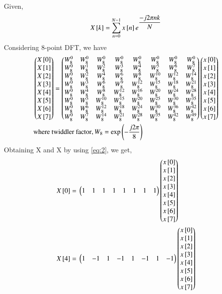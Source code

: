 \documentclass[journal,12pt,twocolumn]{IEEEtran}
\begin{document}
Given, $$X{}\left[k\right]= \sum_{n=0}^{N-1} x{}\left[n\right]e^{\dfrac{-j2\pi nk}{N}}$$
Considering 8-point DFT, we have 
\begin{align}
&\begin{pmatrix}X{}\left[0\right]\\X{}\left[1\right]\\X{}\left[2\right]\\X{}\left[3\right]\\X{}\left[4\right]\\X{}\left[5\right]\\X{}\left[6\right]\\X{}\left[7\right]\end{pmatrix} = \begin{pmatrix}W_{8}^{0}&W_{8}^{0}&W_{8}^{0}&W_{8}^{0}&W_{8}^{0}&W_{8}^{0}&W_{8}^{0}&W_{8}^{0}\\W_{8}^{0}&W_{8}^{1}&W_{8}^{2}&W_{8}^{3}&W_{8}^{4}&W_{8}^{5}&W_{8}^{6}&W_{8}^{7}\\W_{8}^{0}&W_{8}^{2}&W_{8}^{4}&W_{8}^{6}&W_{8}^{8}&W_{8}^{10}&W_{8}^{12}&W_{8}^{14}\\W_{8}^{0}&W_{8}^{3}&W_{8}^{6}&W_{8}^{9}&W_{8}^{12}&W_{8}^{15}&W_{8}^{18}&W_{8}^{21}\\W_{8}^{0}&W_{8}^{4}&W_{8}^{8}&W_{8}^{12}&W_{8}^{16}&W_{8}^{20}&W_{8}^{24}&W_{8}^{28}\\W_{8}^{0}&W_{8}^{5}&W_{8}^{10}&W_{8}^{15}&W_{8}^{20}&W_{8}^{25}&W_{8}^{30}&W_{8}^{35}\\W_{8}^{0}&W_{8}^{6}&W_{8}^{12}&W_{8}^{18}&W_{8}^{24}&W_{8}^{30}&W_{8}^{36}&W_{8}^{42}\\W_{8}^{0}&W_{8}^{7}&W_{8}^{14}&W_{8}^{21}&W_{8}^{28}&W_{8}^{35}&W_{8}^{42}&W_{8}^{49}\end{pmatrix}\begin{pmatrix}x{}\left[0\right]\\x{}\left[1\right]\\x{}\left[2\right]\\x{}\left[3\right]\\x{}\left[4\right]\\x{}\left[5\right]\\x{}\left[6\right]\\x{}\left[7\right]\end{pmatrix} \label{eq:1}\\
&\text{where twiddler factor}, W_{8} = \text{exp}\left(-\frac{j2\pi}{8}\right) \label{eq:2}
\end{align}
Obtaining X and X by using \eqref{eq:2}, we get,
\begin{align}
X{}\left[0\right]={}&\begin{pmatrix}1&1&1&1&1&1&1&1\end{pmatrix}\begin{pmatrix}x{}\left[0\right]\\x{}\left[1\right]\\x{}\left[2\right]\\x{}\left[3\right]\\x{}\left[4\right]\\x{}\left[5\right]\\x{}\left[6\right]\\x{}\left[7\right]\end{pmatrix} \label{eq:3}\\
X{}\left[4\right]={}&\begin{pmatrix}1&-1&1&-1&1&-1&1&-1\end{pmatrix}\begin{pmatrix}x{}\left[0\right]\\x{}\left[1\right]\\x{}\left[2\right]\\x{}\left[3\right]\\x{}\left[4\right]\\x{}\left[5\right]\\x{}\left[6\right]\\x{}\left[7\right]\end{pmatrix} \label{eq:4}
\end{align}
\end{document}
